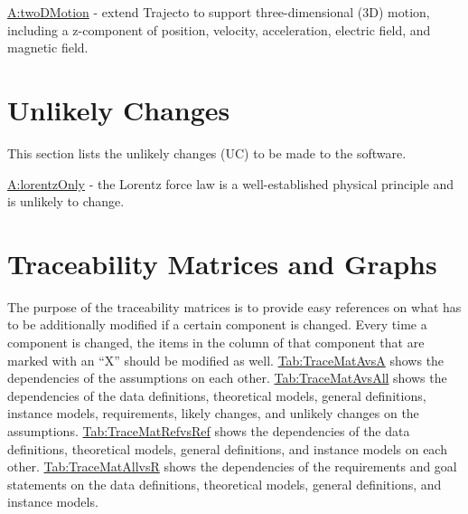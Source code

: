 \documentclass[12pt]{article}
\begin{document}
\begin{description}[font=\normalfont]
\item[lcExtendTo3D:\phantomsection\label{lcExtendTo3D}]{\hyperref[twoDMotion]{A:twoDMotion} - extend Trajecto to support three-dimensional (3D) motion, including a z-component of position, velocity, acceleration, electric field, and magnetic field.}
\end{description}
\section{Unlikely Changes}
\label{Sec:UCs}
This section lists the unlikely changes (UC) to be made to the software.

\begin{description}[font=\normalfont]
\item[ucLorentzForce:\phantomsection\label{ucLorentzForce}]{\hyperref[lorentzOnly]{A:lorentzOnly} - the Lorentz force law is a well-established physical principle and is unlikely to change.}
\end{description}
\section{Traceability Matrices and Graphs}
\label{Sec:TraceMatrices}
The purpose of the traceability matrices is to provide easy references on what has to be additionally modified if a certain component is changed. Every time a component is changed, the items in the column of that component that are marked with an ``X'' should be modified as well. \hyperref[Table:TraceMatAvsA]{Tab:TraceMatAvsA} shows the dependencies of the assumptions on each other. \hyperref[Table:TraceMatAvsAll]{Tab:TraceMatAvsAll} shows the dependencies of the data definitions, theoretical models, general definitions, instance models, requirements, likely changes, and unlikely changes on the assumptions. \hyperref[Table:TraceMatRefvsRef]{Tab:TraceMatRefvsRef} shows the dependencies of the data definitions, theoretical models, general definitions, and instance models on each other. \hyperref[Table:TraceMatAllvsR]{Tab:TraceMatAllvsR} shows the dependencies of the requirements and goal statements on the data definitions, theoretical models, general definitions, and instance models.
\end{document}
